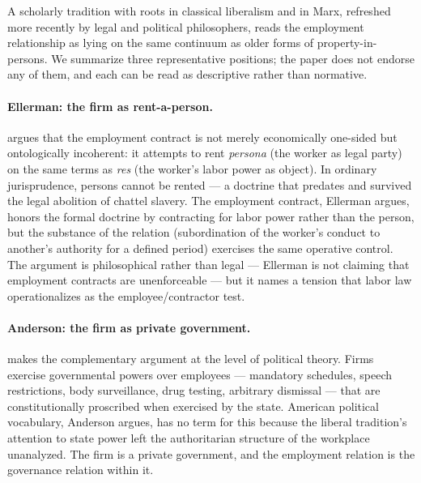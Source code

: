 \documentclass[11pt,a4paper]{article}
\theoremstyle{remark}
\begin{document}
A scholarly tradition with roots in classical liberalism and in
Marx, refreshed more recently by legal and political philosophers,
reads the employment relationship as lying on the same continuum
as older forms of property-in-persons. We summarize three
representative positions; the paper does not endorse any of them,
and each can be read as descriptive rather than normative.

\paragraph{Ellerman: the firm as rent-a-person.}
\citet{ellerman1992property} argues that the employment contract is
not merely economically one-sided but ontologically incoherent: it
attempts to rent \emph{persona} (the worker as legal party) on the
same terms as \emph{res} (the worker's labor power as object). In
ordinary jurisprudence, persons cannot be rented --- a doctrine
that predates and survived the legal abolition of chattel slavery.
The employment contract, Ellerman argues, honors the formal
doctrine by contracting for labor power rather than the person, but
the substance of the relation (subordination of the worker's
conduct to another's authority for a defined period) exercises the
same operative control. The argument is philosophical rather than
legal --- Ellerman is not claiming that employment contracts are
unenforceable --- but it names a tension that labor law
operationalizes as the employee/contractor test.

\paragraph{Anderson: the firm as private government.}
\citet{anderson2017private} makes the complementary argument at the
level of political theory. Firms exercise governmental powers over
employees --- mandatory schedules, speech restrictions, body
surveillance, drug testing, arbitrary dismissal --- that are
constitutionally proscribed when exercised by the state. American
political vocabulary, Anderson argues, has no term for this because
the liberal tradition's attention to state power left the
authoritarian structure of the workplace unanalyzed. The firm is
a private government, and the employment relation is the
governance relation within it.
\end{document}
